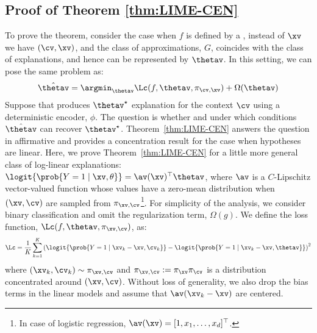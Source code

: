 \documentclass[twoside,11pt]{article}
\begin{document}
\subsection{Proof of Theorem \ref{thm:LIME-CEN}}
\label{proof:LIME-CEN}

To prove the theorem, consider the case when $f$ is defined by a {\CEN}, instead of $\xv$ we have $(\cv, \xv)$, and the class of approximations, $G$, coincides with the class of explanations, and hence can be represented by $\thetav$.
In this setting, we can pose the same problem as:
\begin{equation}
    \label{eq:lime-cen}
    \hat \thetav = \argmin_{\thetav} \Lc(f, \thetav, \pi_{\cv, \xv}) + \Omega(\thetav)
\end{equation}
Suppose that {\CEN} produces $\thetav^\star$ explanation for the context $\cv$ using a deterministic encoder, $\phi$.
The question is whether and under which conditions $\hat \thetav$ can recover $\thetav^\star$.
Theorem~\ref{thm:LIME-CEN} answers the question in affirmative and provides a concentration result for the case when hypotheses are linear.
Here, we prove Theorem~\ref{thm:LIME-CEN} for a little more general class of log-linear explanations: $\logit{\prob{Y = 1 \mid \xv, \theta}} = \av(\xv)^\top \thetav$, where $\av$ is a $C$-Lipschitz vector-valued function whose values have a zero-mean distribution when $(\xv, \cv)$ are sampled from $\pi_{\xv,\cv}$\footnote{In case of logistic regression, $\av(\xv) = [1, x_1, \dots, x_d]^\top$.}.
For simplicity of the analysis, we consider binary classification and omit the regularization term, $\Omega(g)$.
We define the loss function, $\Lc(f, \thetav, \pi_{\xv, \cv})$, as:
\begin{equation}
    \Lc = \frac{1}{K} \sum_{k=1}^K \left(\logit{\prob{Y = 1 \mid \xv_k - \xv, \cv_k}} - \logit{\prob{Y = 1 \mid \xv_k - \xv, \thetav}}\right)^2
\end{equation}
where $(\xv_k, \cv_k) \sim \pi_{\xv, \cv}$ and $\pi_{\xv, \cv} := \pi_{\xv} \pi_{\cv}$ is a distribution concentrated around $(\xv, \cv)$.
Without loss of generality, we also drop the bias terms in the linear models and assume that $\av(\xv_k - \xv)$ are centered.
\end{document}
